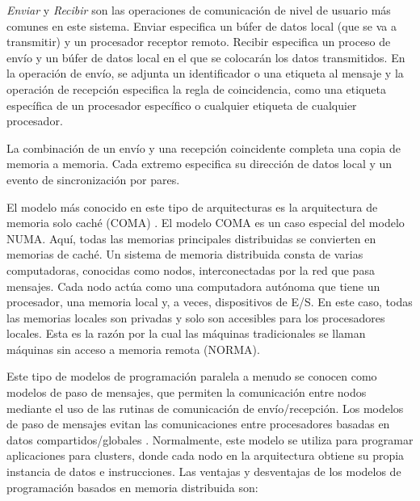 \emph{Enviar} y \emph{Recibir} son las operaciones de comunicación de nivel de usuario más comunes en este sistema. Enviar especifica un búfer de datos local (que se va a transmitir) y un procesador receptor remoto. Recibir especifica un proceso de envío y un búfer de datos local en el que se colocarán los datos transmitidos. En la operación de envío, se adjunta un identificador o una etiqueta al mensaje y la operación de recepción especifica la regla de coincidencia, como una etiqueta específica de un procesador específico o cualquier etiqueta de cualquier procesador.

La combinación de un envío y una recepción coincidente completa una copia de memoria a memoria. Cada extremo especifica su dirección de datos local y un evento de sincronización por pares.

El modelo más conocido en este tipo de arquitecturas es la arquitectura de memoria solo caché (COMA) \cite{hagersten1999multiprocessing}. El modelo COMA es un caso especial del modelo NUMA. Aquí, todas las memorias principales distribuidas se convierten en memorias de caché. Un sistema de memoria distribuida consta de varias computadoras, conocidas como nodos, interconectadas por la red que pasa mensajes. Cada nodo actúa como una computadora autónoma que tiene un procesador, una memoria local y, a veces, dispositivos de E/S. En este caso, todas las memorias locales son privadas y solo son accesibles para los procesadores locales. Esta es la razón por la cual las máquinas tradicionales se llaman máquinas sin acceso a memoria remota (NORMA).

Este tipo de modelos de programación paralela a menudo se conocen como modelos de paso de mensajes, que permiten la comunicación entre nodos mediante el uso de las rutinas de comunicación de envío/recepción. Los modelos de paso de mensajes evitan las comunicaciones entre procesadores basadas en datos compartidos/globales \cite{multicorestate}. Normalmente, este modelo se utiliza para programar aplicaciones para clusters, donde cada nodo en la arquitectura obtiene su propia instancia de datos e instrucciones. Las ventajas y desventajas de los modelos de programación basados en memoria distribuida son:

